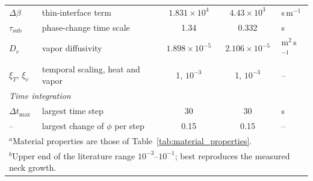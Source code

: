 {\begin{table}[htbp]
\begin{tabular}{l l c c l}
 $\Delta\beta$ & thin-interface term & $1.831 \times 10^{4}$ & $4.43 \times 10^{3}$ & s\,m$^{-1}$ \\
 $\tau_{\mathrm{sub}}$ & phase-change time scale & 1.34 & 0.332 & s \\
 $D_v$ & vapor diffusivity & $1.898 \times 10^{-5}$ & $2.106 \times 10^{-5}$ & m$^{2}$\,s$^{-1}$ \\
 $\xi_T$, $\xi_v$ & temporal scaling, heat and vapor & 1, $10^{-3}$ & 1, $10^{-3}$ & -- \\
 \multicolumn{5}{l}{\textit{Time integration}} \\
 $\Delta t_{\max}$ & largest time step & 30 & 30 & s \\
 -- & largest change of $\phi$ per step & 0.15 & 0.15 & -- \\
\hline
\multicolumn{5}{l}{$^{a}$Material properties are those of Table~\ref{tab:material_properties}.} \\
\multicolumn{5}{l}{$^{b}$Upper end of the literature range $10^{-3}$--$10^{-1}$; best reproduces the measured neck growth.}
\end{tabular}
\label{tab:grainpair_parameters}
\end{table}
}
